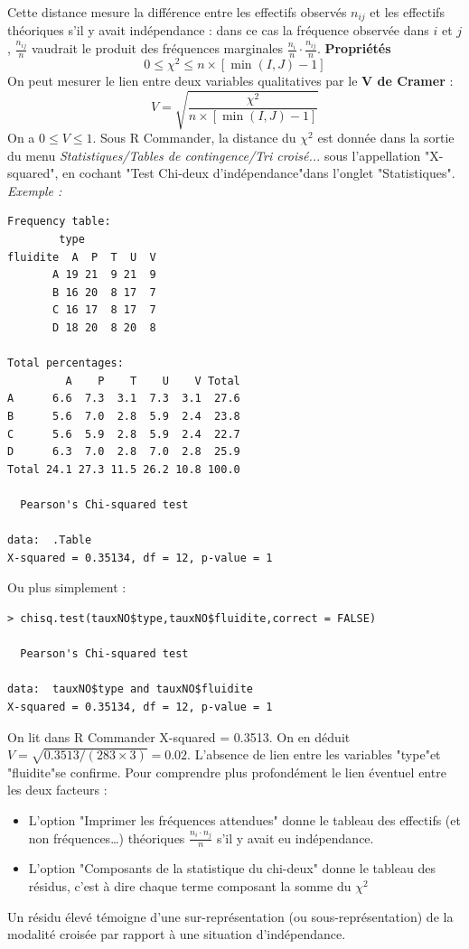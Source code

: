 Cette distance mesure la différence entre les effectifs observés $n_{ij}$ et les effectifs théoriques s'il y avait indépendance : dans ce cas la fréquence observée dans $i$ et $j$ , $\frac{n_{ij}}{n}$ vaudrait le produit des fréquences marginales $\frac{n_{i}}{n}\cdot\frac{n_{ij}}{n}$.\newline
\textbf{Propriétés}
$$0 \leq \chi^{2} \leq n\times [\min(I,J)-1]$$
On peut mesurer le lien entre deux variables qualitatives par le \textbf{V de Cramer} :
$$V = \sqrt{\frac{\chi^{2}}{n\times [\min(I,J)-1]}}$$
On a $0\leq V\leq 1$.
Sous R Commander, la distance du  $\chi^{2}$ est donnée dans la sortie du menu \textit{Statistiques/Tables de contingence/Tri croisé...} sous l'appellation "X-squared", en cochant "Test Chi-deux d'indépendance"dans l'onglet "Statistiques".\newline
\textit{Exemple :}
\begin{lstlisting}[language=html]
Frequency table:
        type
fluidite  A  P  T  U  V
       A 19 21  9 21  9
       B 16 20  8 17  7
       C 16 17  8 17  7
       D 18 20  8 20  8

Total percentages:
         A    P    T    U    V Total
A      6.6  7.3  3.1  7.3  3.1  27.6
B      5.6  7.0  2.8  5.9  2.4  23.8
C      5.6  5.9  2.8  5.9  2.4  22.7
D      6.3  7.0  2.8  7.0  2.8  25.9
Total 24.1 27.3 11.5 26.2 10.8 100.0

  Pearson's Chi-squared test

data:  .Table
X-squared = 0.35134, df = 12, p-value = 1
\end{lstlisting}
Ou plus simplement : 
\begin{lstlisting}[language=html]
> chisq.test(tauxNO$type,tauxNO$fluidite,correct = FALSE)

  Pearson's Chi-squared test

data:  tauxNO$type and tauxNO$fluidite
X-squared = 0.35134, df = 12, p-value = 1
\end{lstlisting}
On lit dans R Commander X-squared = 0.3513.\newline
On en déduit $V =\sqrt{0.3513/(283 \times 3)} = 0.02$. L'absence de lien entre les variables "type"et "fluidite"se confirme.\newline
Pour comprendre plus profondément le lien éventuel entre les deux facteurs :
\begin{itemize}
\item L'option "Imprimer les fréquences attendues" donne le tableau des effectifs
(et non fréquences\dots) théoriques $\frac{n_{i}\cdot n_{j}}{n}$ s'il y avait eu indépendance.
\item L'option "Composants de la statistique du chi-deux" donne le tableau des
résidus, c'est à dire chaque terme composant la somme du $\chi^{2}$
\end{itemize}
Un résidu élevé témoigne d'une sur-représentation (ou sous-représentation) de
la modalité croisée par rapport à une situation d'indépendance.
